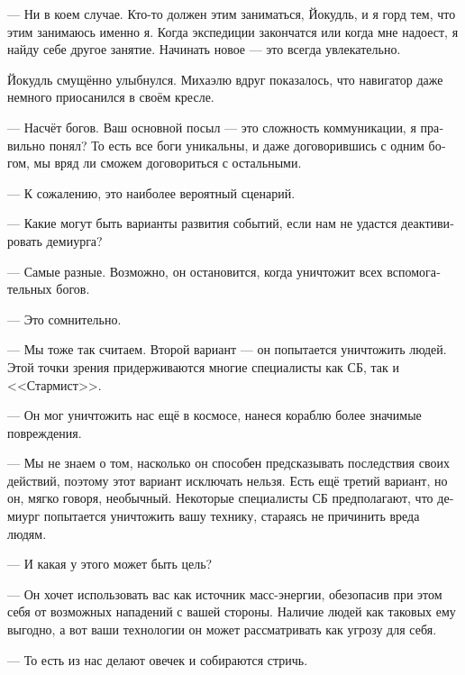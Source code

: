 \documentclass[a4paper,12pt,fleqn]{book}\usepackage{polyglossia}\setdefaultlanguage[babelshorthands=true]{russian}\setotherlanguage{english}\defaultfontfeatures{Ligatures=TeX,Mapping=tex-text}\usepackage{xcolor}\newcommand{\ml}[3]{#2}
\begin{document}
--- Ни в коем случае.
Кто-то должен этим заниматься, Йокудль, и я горд тем, что этим занимаюсь именно я.
Когда экспедиции закончатся или когда мне надоест, я найду себе другое занятие.
Начинать новое --- это всегда увлекательно.

Йокудль смущённо улыбнулся.
Михаэлю вдруг показалось, что навигатор даже немного приосанился в своём кресле.

--- Насчёт богов.
Ваш основной посыл --- это сложность коммуникации, я правильно понял?
То есть все боги уникальны, и даже договорившись с одним богом, мы вряд ли сможем договориться с остальными.

--- К сожалению, это наиболее вероятный сценарий.

--- Какие могут быть варианты развития событий, если нам не удастся деактивировать демиурга?

--- Самые разные.
Возможно, он остановится, когда уничтожит всех вспомогательных богов.

\ml{$0$}
{--- Это сомнительно.}
{``Hard to believe.''}

--- Мы тоже так считаем.
\ml{$0$}
{Второй вариант --- он попытается уничтожить людей.}
{The second option: it will try to wipe humans out.}
Этой точки зрения придерживаются многие специалисты как СБ, так и <<Стармист>>.

\ml{$0$}
{--- Он мог уничтожить нас ещё в космосе, нанеся кораблю более значимые повреждения.}
{``It could do it in space, causing more serious damage to the ship.''}

\ml{$0$}
{--- Мы не знаем о том, насколько он способен предсказывать последствия своих действий, поэтому этот вариант исключать нельзя.}
{``We know nothing about its ability to predict consequences of its actions, so that option cannot be excluded.}
\ml{$0$}
{Есть ещё третий вариант, но он, мягко говоря, необычный.}
{There is one more, but this option, to put it mildly, unusual.}
\ml{$0$}
{Некоторые специалисты СБ предполагают, что демиург попытается уничтожить вашу технику, стараясь не причинить вреда людям.}
{Some SSC specialists suggest that the demiurge will try to destroy your equipment and not to harm humans.''}

--- И какая у этого может быть цель?

--- Он хочет использовать вас как источник масс-энергии, обезопасив при этом себя от возможных нападений с вашей стороны.
Наличие людей как таковых ему выгодно, а вот ваши технологии он может рассматривать как угрозу для себя.

\ml{$0$}
{--- То есть из нас делают овечек и собираются стричь.}
{``So it will try to turn us into sheeps to shear.''}
\end{document}
